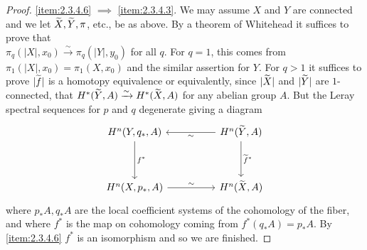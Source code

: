 \documentclass[../main]{subfiles}
\begin{document}
\begin{proof}
\ref{item:2.3.4.6} $\implies$ \ref{item:2.3.4.3}. We may assume $X$ and $Y$ are connected and we let $\xtilde{X}, \xtilde{Y}, \pi $, etc., be as above. By a theorem of Whitehead it suffices to prove that \\$\pi_q (|X|, x_0) \xrightarrow{\sim} \pi_q (|Y|, y_0)$ for all $q$. For $q = 1$, this comes from \\$\pi_1 (|X|, x_0) = \pi_1 (X, x_0)$ and the similar assertion for $Y$. For $q> 1$ it suffices to prove $|\xtilde{f}|$ is a homotopy equivalence or equivalently, since $|\xtilde{X}|$ and $|\xtilde{Y}|$ are $1$-connected, that $H^{\ast }(\xtilde{Y}, A) \xrightarrow{\sim} H^{\ast } (\xtilde{X}, A)$ for any abelian group $A$. But the Leray spectral sequences for $p$ and $q$ degenerate giving a diagram 
\[\begin{tikzcd}
	{H^n (Y, q_{\ast}, A)} && {H^n (\xtilde{Y}, A)} \\ \\
	{H^n (X, p_{\ast}, A)} && {H^n(\xtilde{X}, A)} 
	\arrow["{f^{\ast}}", from=1-1, to=3-1]
	\arrow["{\xtilde{f}^{\ast}}", from=1-3, to=3-3]
	\arrow["\sim", from=1-3, to=1-1]
	\arrow["\sim", from=3-1, to=3-3]
\end{tikzcd}\]
where $p_{\ast }A, q_{\ast }A$ are the local coefficient systems of the cohomology of the fiber, and where $f^{\ast }$ is the map on cohomology coming from $f^{\ast } (q_{\ast }A) = p_{\ast }A$. By \ref{item:2.3.4.6} $f^{\ast }$ is an isomorphism and so we are finished.
\end{proof}
\end{document}
